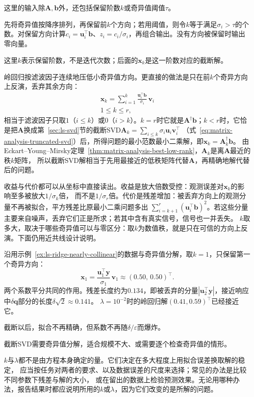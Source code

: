 这里的输入除$\bm A,\bm b$外，还包括保留阶数$k$或奇异值阈值$\tau$。

先将奇异值按降序排列，再保留前$k$个方向；若用阈值，则令$k$等于满足$\sigma_i>\tau$的个数。对保留方向计算$c_i=\bm u_i^\top\bm b$、$z_i=c_i/\sigma_i$，再组合输出。没有方向被保留时输出零向量。

这里$k$表示保留阶数，不是迭代次数；后面的$\bm x_k$是这一阶数对应的截断解。

岭回归按滤波因子连续地压低小奇异值方向。更直接的做法是只在前$k$个奇异方向上反演，丢弃其余方向：
\[
\begin{gathered}
\bm x_k=\sum_{i=1}^k\frac{\bm u_i^\top\bm b}{\sigma_i}\,\bm v_i\\
1\leq k\leq r ,
\end{gathered}
\]
相当于滤波因子只取$1$（$i\leq k$）或$0$（$i>k$）。$k=r$时它就是$\bm A^\dagger\bm b$；$k<r$时，它恰是把$\bm A$换成第~\ref{sec:ls-svd}节的截断SVD$\bm A_k=\sum_{i\leq k}\sigma_i\bm u_i\bm v_i^\top$
（式~\eqref{eq:matrix-analysis-truncated-svd}）后，所得问题的最小范数最小二乘解，即$\bm x_k=\bm A_k^\dagger\bm b$。
由Eckart--Young--Mirsky定理~\ref{thm:matrix-analysis-best-low-rank}，$\bm A_k$是离$\bm A$最近的秩$k$矩阵，
所以截断SVD解相当于先用最接近的低秩矩阵代替$\bm A$，再精确地解代替后的问题。

收益与代价都可以从坐标中直接读出。收益是放大倍数受控：观测误差对$\bm x_k$的影响至多被放大$1/\sigma_k$倍，
而不是$1/\sigma_r$倍。代价是残差增加：被丢弃方向上的观测分量不再被拟合，平方残差比原最小二乘问题多出
$\sum_{i=k+1}^r(\bm u_i^\top\bm b)^2$。若这些分量主要来自噪声，丢弃它们正是所求；若其中含有真实信号，信号也一并丢失。
$k$取多大，取决于哪些奇异值可以与零区分：取$k$为数值秩，就是只在可信的方向上反演。下面仍用近共线设计说明。

\begin{example}[近共线设计上的截断SVD]
\label{ex:ls-tsvd-nearly-collinear}
沿用示例~\ref{ex:ls-ridge-nearly-collinear}的数据与奇异值分解，取$k=1$，只保留第一个奇异方向：
\[
 \bm x_1=\frac{\bm u_1^\top\bm y}{\sigma_1}\,\bm v_1\approx(0.50,\,0.50)^\top .
\]
两个系数平分共同的作用。残差长度约为$0.134$，即被丢弃的分量$|\bm u_2^\top\bm y|$，接近响应中$\delta\bm q$部分的长度$\delta\sqrt2\approx0.141$。
$\lambda=10^{-2}$时的岭回归解$(0.41,0.59)^\top$已经接近它。
\end{example}

截断以后，拟合不再精确，但系数不再随$\delta/\varepsilon$而爆炸。

截断SVD需要奇异值分解，适合规模不大、或需要逐个检查奇异值的情形。

$k$与$\lambda$都不是由方程本身确定的量。它们决定在多大程度上用拟合误差换取解的稳定，
应当按任务对两者的要求、以及数据误差的尺度来选择；常见的办法是比较不同参数下残差与解的大小，
或在留出的数据上检验预测效果。无论用哪种办法，报告结果时都应说明所用的$k$或$\lambda$，因为它们改变的是所解的问题。
